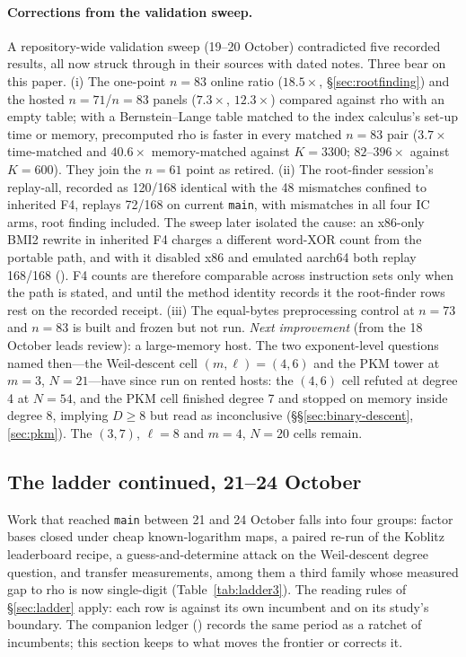 \paragraph{Corrections from the validation sweep.} A repository-wide
validation sweep (19--20 October) contradicted five recorded results, all
now struck through in their sources with dated notes. Three bear on this
paper. (i) The one-point $n=83$ online ratio ($18.5\times$,
\S\ref{sec:rootfinding}) and the hosted $n=71$/$n=83$ panels ($7.3\times$,
$12.3\times$) compared against rho with an empty table; with a
Bernstein--Lange table matched to the index calculus's set-up time or
memory, precomputed rho is faster in every matched $n=83$ pair
($3.7\times$ time-matched and $40.6\times$ memory-matched against $K=3300$;
$82$--$396\times$ against $K=600$). They join the $n=61$ point as retired.
(ii) The root-finder session's replay-all, recorded as 120/168 identical with
the 48 mismatches confined to inherited F4, replays 72/168 on current
\texttt{main}, with mismatches in all four IC arms, root finding included.
The sweep later isolated the cause: an x86-only BMI2 rewrite in inherited F4
charges a different word-XOR count from the portable path, and with it
disabled x86 and emulated aarch64 both replay 168/168
().
F4 counts are therefore comparable across instruction sets only when the
path is stated, and until the method identity records it the root-finder
rows rest on the recorded receipt. (iii) The equal-bytes preprocessing control at
$n=73$ and $n=83$ is built and frozen but not run.
\emph{Next improvement} (from the 18 October leads review): a large-memory
host. The two exponent-level questions named then---the Weil-descent cell
$(m,\ell)=(4,6)$ and the PKM tower at $m=3$, $N=21$---have since run on
rented hosts: the $(4,6)$ cell refuted at degree 4 at $N=54$, and the PKM
cell finished degree 7 and stopped on memory inside degree 8, implying
$D\ge8$ but read as inconclusive (\S\S\ref{sec:binary-descent},\ref{sec:pkm}).
The $(3,7)$, $\ell=8$ and $m=4$, $N=20$ cells remain.

\subsection{The ladder continued, 21--24 October}\label{sec:ladder3}

Work that reached \texttt{main} between 21 and 24 October falls into four
groups: factor bases closed under cheap known-logarithm maps, a paired
re-run of the Koblitz leaderboard recipe, a guess-and-determine attack on
the Weil-descent degree question, and transfer measurements, among them a
third family whose measured gap to rho is now single-digit
(Table~\ref{tab:ladder3}). The reading rules of \S\ref{sec:ladder} apply:
each row is against its own incumbent and on its study's boundary. The
companion ledger () records the
same period as a ratchet of incumbents; this section keeps to what moves
the frontier or corrects it.

